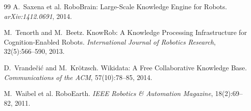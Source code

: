 \documentclass[10pt,a4paper]{article}
\begin{document}
\begin{thebibliography}{99}
A.~Saxena et al.
\newblock RoboBrain: Large-Scale Knowledge Engine for Robots.
\newblock \emph{arXiv:1412.0691}, 2014.

M.~Tenorth and M.~Beetz.
\newblock KnowRob: A Knowledge Processing Infrastructure for Cognition-Enabled
  Robots.
\newblock \emph{International Journal of Robotics Research}, 32(5):566--590, 2013.

D.~Vrande{\v{c}}i{\'c} and M.~Kr{\"o}tzsch.
\newblock Wikidata: A Free Collaborative Knowledge Base.
\newblock \emph{Communications of the ACM}, 57(10):78--85, 2014.

M.~Waibel et al.
\newblock RoboEarth.
\newblock \emph{IEEE Robotics \& Automation Magazine}, 18(2):69--82, 2011.

\end{thebibliography}
\end{document}
